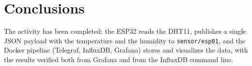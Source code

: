 \documentclass[11pt,a4paper]{article}
\begin{document}
\section{Conclusions}

The activity has been completed: the ESP32 reads the DHT11, publishes a single JSON payload
with the temperature and the humidity to \texttt{sensor/esp01}, and the Docker pipeline
(Telegraf, InfluxDB, Grafana) stores and visualizes the data, with the results verified both
from Grafana and from the InfluxDB command line.
\end{document}
